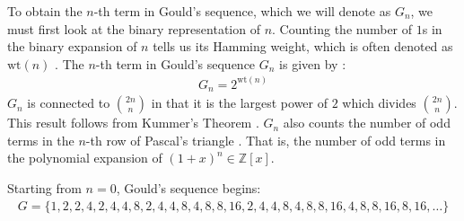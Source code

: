 \documentclass{article}
\theoremstyle{plain}
\theoremstyle{definition}
\newcommand{\Z}{\mathbb{Z}}
\newcommand{\wt}[1]{\text{wt}(#1)}
\begin{document}
To obtain the $n$-th term in Gould's sequence, which we will denote as $G_n$, we must first look at the binary representation of $n$. Counting the number of $1$s in the binary expansion of $n$ tells us its Hamming weight, which is often denoted as $\wt{n}$ \cite{Lin2004}. The $n$-th term in Gould's sequence $G_n$ is given by \cite{A001316}:
\begin{align}
    G_n = 2^{\wt{n}}
\end{align}
$G_n$ is connected to $\binom{2n}{n}$ in that it is the largest power of $2$ which divides $\binom{2n}{n}$. This result follows from Kummer's Theorem \cite{Kummer1857}. $G_n$ also counts the number of odd terms in the $n$-th row of Pascal's triangle \cite{Glaisher1899}. That is, the number of odd terms in the polynomial expansion of $(1+x)^n \in \Z[x]$.

Starting from $n=0$, Gould's sequence begins:
\begin{align*}
    G = \{ 1, 2, 2, 4, 2, 4, 4, 8, 2, 4, 4, 8, 4, 8, 8, 16, 2, 4, 4, 8, 4, 8, 8, 16, 4, 8, 8, 16, 8, 16, \ldots \}
\end{align*}
\end{document}
